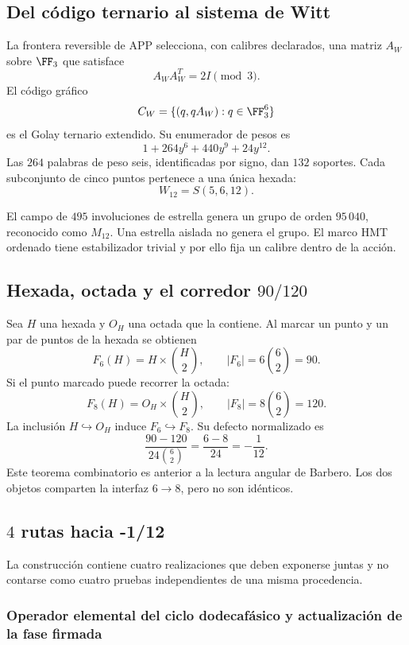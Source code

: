 \subsection{Del código ternario al sistema de Witt}

La frontera reversible de APP selecciona, con calibres declarados, una matriz
\(A_W\) sobre \(\FF_3\) que satisface
\[
A_WA_W^T=2I\pmod3.
\]
El código gráfico
\[
C_W=\{(q,qA_W):q\in\FF_3^6\}
\]
es el Golay ternario extendido. Su enumerador de pesos es
\[
1+264y^6+440y^9+24y^{12}.
\]
Las \(264\) palabras de peso seis, identificadas por signo, dan \(132\)
soportes. Cada subconjunto de cinco puntos pertenece a una única hexada:
\[
W_{12}=S(5,6,12).
\]

El campo de \(495\) involuciones de estrella genera un grupo de orden
\(95\,040\), reconocido como \(M_{12}\). Una estrella aislada no genera el
grupo. El marco HMT ordenado tiene estabilizador trivial y por ello fija un
calibre dentro de la acción.

\subsection{Hexada, octada y el corredor \texorpdfstring{\(90/120\)}{90/120}}

Sea \(H\) una hexada y \(O_H\) una octada que la contiene. Al marcar un punto
y un par de puntos de la hexada se obtienen
\[
F_6(H)=H\times\binom H2,
\qquad
|F_6|=6\binom62=90.
\]
Si el punto marcado puede recorrer la octada:
\[
F_8(H)=O_H\times\binom H2,
\qquad
|F_8|=8\binom62=120.
\]
La inclusión \(H\hookrightarrow O_H\) induce \(F_6\hookrightarrow F_8\).
Su defecto normalizado es
\[
\boxed{
\frac{90-120}{24\binom62}
=\frac{6-8}{24}
=-\frac1{12}.}
\]
Este teorema combinatorio es anterior a la lectura angular de Barbero. Los
dos objetos comparten la interfaz \(6\to8\), pero no son idénticos.

\subsection{\(4\) rutas hacia -1/12}

La construcción contiene cuatro realizaciones que deben exponerse juntas y no
contarse como cuatro pruebas independientes de una misma procedencia.

\subsubsection{Operador elemental del ciclo dodecafásico y actualización de la fase firmada}

